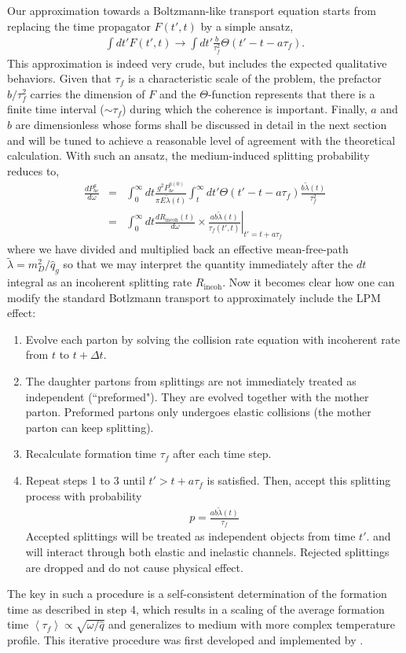 \documentclass[aps, prc, reprint, amsmath, groupedaddress, nofootinbib]{revtex4-1}
\begin{document}
Our approximation towards a Boltzmann-like transport equation starts from replacing the time propagator $F(t',t)$ by a simple ansatz,
\begin{eqnarray}
\int dt' F(t', t) \rightarrow \int dt' \frac{b}{\tau_f^2}\Theta(t'-t-a\tau_f).
\end{eqnarray}
This approximation is indeed very crude, but includes the expected qualitative behaviors. 
Given that $\tau_f$ is a characteristic scale of the problem, the prefactor $b/\tau_f^2$ carries the dimension of $F$ and the $\Theta$-function represents that there is a finite time interval ($\sim \tau_f$) during which the coherence is important.
Finally, $a$ and $b$ are dimensionless whose forms shall be discussed in detail in the next section and will be tuned to achieve a reasonable level of agreement with the theoretical calculation.
With such an ansatz, the medium-induced splitting probability reduces to,
\begin{eqnarray}
\nonumber
\frac{dP^{a}_{bc}}{d\omega} &=& \int_0^\infty dt \frac{g^2 P_{bc}^{a(0)}}{\pi E\tilde{\lambda}(t)} \int_t^\infty dt'  \Theta(t'-t-a\tau_f) \frac{b \tilde{\lambda}(t)}{\tau_f^2} \\
&=& \int_0^\infty dt \frac{dR_{\textrm{incoh}}(t)}{d\omega} \times \left.\frac{ab\tilde{\lambda}(t)}{\tau_f(t',t)}\right|_{t'=t+a\tau_f}
\end{eqnarray}
where we have divided and multiplied back an effective mean-free-path $\tilde{\lambda} = m_D^2/\hat{q}_g$ so that we may interpret the quantity immediately after the $dt$ integral as an incoherent splitting rate $R_{\textrm{incoh}}$.
Now it becomes clear how one can modify the standard Botlzmann transport to approximately include the LPM effect:
\begin{enumerate}
\item Evolve each parton by solving the collision rate equation with incoherent rate from $t$ to $t+\Delta t$.
\item The daughter partons from splittings are not immediately treated as independent (``preformed"). They are evolved together with the mother parton. Preformed partons only undergoes elastic collisions (the mother parton can keep splitting).
\item Recalculate formation time $\tau_f$ after each time step.
\item Repeat steps 1 to 3 until $t' > t + a\tau_f$ is satisfied. 
Then, accept this splitting process with probability 
\begin{eqnarray}
p = \frac{ab\tilde{\lambda}(t)}{\tau_f}
\label{eq:rejection}
\end{eqnarray}
Accepted splittings will be treated as independent objects from time $t'$. and will interact through both elastic and inelastic channels.
Rejected splittings are dropped and do not cause physical effect.
\end{enumerate} 
The key in such a procedure is a self-consistent determination of the formation time as described in step 4, which results in a scaling of the average formation time $\left\langle\tau_f\right\rangle \propto \sqrt{\omega/\hat{q}}$ and generalizes to medium with more complex temperature profile.
This iterative procedure was first developed and implemented by \cite{Zapp:2011ya}.
\end{document}
